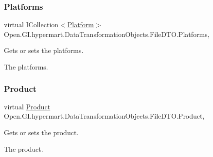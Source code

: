 \subsubsection{\texorpdfstring{Platforms}{Platforms}}
{\footnotesize\ttfamily virtual I\+Collection$<$\hyperlink{class_open_1_1_g_i_1_1hypermart_1_1_models_1_1_platform}{Platform}$>$ Open.\+G\+I.\+hypermart.\+Data\+Transformation\+Objects.\+File\+D\+T\+O.\+Platforms\hspace{0.3cm}{\ttfamily [get]}, {\ttfamily [set]}}



Gets or sets the platforms. 

The platforms. \hypertarget{class_open_1_1_g_i_1_1hypermart_1_1_data_transformation_objects_1_1_file_d_t_o_aa587dd986d4c6d62d8bf5520d3a48e79}{}\label{class_open_1_1_g_i_1_1hypermart_1_1_data_transformation_objects_1_1_file_d_t_o_aa587dd986d4c6d62d8bf5520d3a48e79} 
\subsubsection{\texorpdfstring{Product}{Product}}
{\footnotesize\ttfamily virtual \hyperlink{class_open_1_1_g_i_1_1hypermart_1_1_models_1_1_product}{Product} Open.\+G\+I.\+hypermart.\+Data\+Transformation\+Objects.\+File\+D\+T\+O.\+Product\hspace{0.3cm}{\ttfamily [get]}, {\ttfamily [set]}}



Gets or sets the product. 

The product. \hypertarget{class_open_1_1_g_i_1_1hypermart_1_1_data_transformation_objects_1_1_file_d_t_o_abd8d9083fbb95dac1e2781f2a8d4f8e9}{}\label{class_open_1_1_g_i_1_1hypermart_1_1_data_transformation_objects_1_1_file_d_t_o_abd8d9083fbb95dac1e2781f2a8d4f8e9} 
